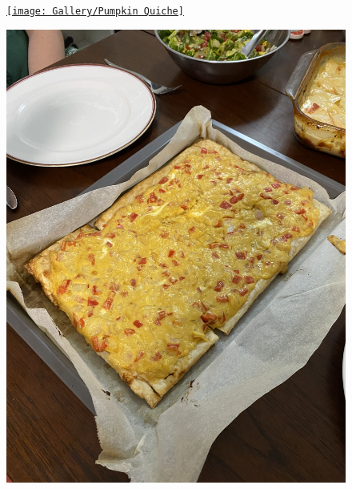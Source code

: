 \documentclass[]{article}
\begin{document}
\newpage\begin{figure}[H]
\begin{center}\hyperref[rec:Pumpkin Quiche]{\texttt{[image: Gallery/Pumpkin Quiche]}}\caption*{}\label{fig:Pumpkin Quiche}\end{center}
\end{figure}
\newpage\begin{figure}[H]
\begin{center}\hyperref[rec:Tarte Dijonnaise]{\includegraphics[keepaspectratio,width=\textheight,height=\textwidth,angle=-90]{Gallery/Tarte Dijonnaise}}\caption*{}\label{fig:Tarte Dijonnaise}\end{center}
\end{figure}
\end{document}
